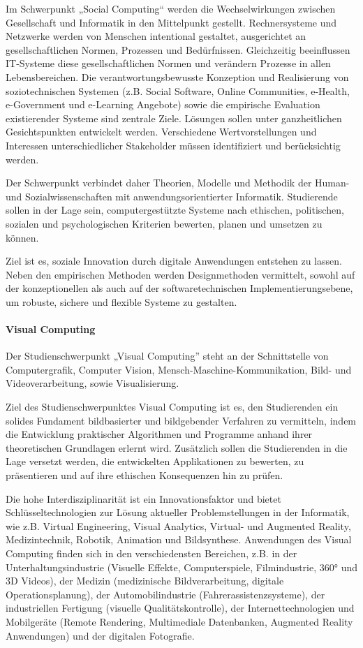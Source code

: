 Im Schwerpunkt „Social Computing`` werden die Wechselwirkungen zwischen
Gesellschaft und Informatik in den Mittelpunkt gestellt. Rechnersysteme
und Netzwerke werden von Menschen intentional gestaltet, ausgerichtet an
gesellschaftlichen Normen, Prozessen und Bedürfnissen. Gleichzeitig
beeinflussen IT-Systeme diese gesellschaftlichen Normen und verändern
Prozesse in allen Lebensbereichen. Die verantwortungsbewusste Konzeption
und Realisierung von soziotechnischen Systemen (z.B. Social Software,
Online Communities, e-Health, e-Government und e-Learning Angebote)
sowie die empirische Evaluation existierender Systeme sind zentrale
Ziele. Lösungen sollen unter ganzheitlichen Gesichtspunkten entwickelt
werden. Verschiedene Wertvorstellungen und Interessen unterschiedlicher
Stakeholder müssen identifiziert und berücksichtig werden.

Der Schwerpunkt verbindet daher Theorien, Modelle und Methodik der
Human- und Sozialwissenschaften mit anwendungsorientierter Informatik.
Studierende sollen in der Lage sein, computergestützte Systeme nach
ethischen, politischen, sozialen und psychologischen Kriterien bewerten,
planen und umsetzen zu können.

Ziel ist es, soziale Innovation durch digitale Anwendungen entstehen zu
lassen. Neben den empirischen Methoden werden Designmethoden vermittelt,
sowohl auf der konzeptionellen als auch auf der softwaretechnischen
Implementierungsebene, um robuste, sichere und flexible Systeme zu
gestalten.

\paragraph{Visual Computing}\label{visual-computing}

Der Studienschwerpunkt „Visual Computing'' steht an der Schnittstelle
von Computergrafik, Computer Vision, Mensch-Maschine-Kommunikation,
Bild- und Videoverarbeitung, sowie Visualisierung.

Ziel des Studienschwerpunktes Visual Computing ist es, den Studierenden
ein solides Fundament bildbasierter und bildgebender Verfahren zu
vermitteln, indem die Entwicklung praktischer Algorithmen und Programme
anhand ihrer theoretischen Grundlagen erlernt wird. Zusätzlich sollen
die Studierenden in die Lage versetzt werden, die entwickelten
Applikationen zu bewerten, zu präsentieren und auf ihre ethischen
Konsequenzen hin zu prüfen.

Die hohe Interdisziplinarität ist ein Innovationsfaktor und bietet
Schlüsseltechnologien zur Lösung aktueller Problemstellungen in der
Informatik, wie z.B. Virtual Engineering, Visual Analytics, Virtual- und
Augmented Reality, Medizintechnik, Robotik, Animation und Bildsynthese.
Anwendungen des Visual Computing finden sich in den verschiedensten
Bereichen, z.B. in der Unterhaltungsindustrie (Visuelle Effekte,
Computerspiele, Filmindustrie, 360° und 3D Videos), der Medizin
(medizinische Bildverarbeitung, digitale Operationsplanung), der
Automobilindustrie (Fahrerassistenzsysteme), der industriellen Fertigung
(visuelle Qualitätskontrolle), der Internettechnologien und Mobilgeräte
(Remote Rendering, Multimediale Datenbanken, Augmented Reality
Anwendungen) und der digitalen Fotografie.


